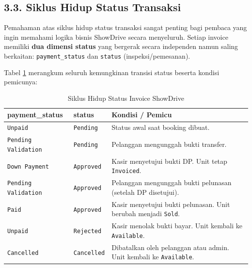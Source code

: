 \documentclass[11pt, a5paper]{article}
\begin{document}
\subsection*{3.3. Siklus Hidup Status Transaksi}

Pemahaman atas siklus hidup status transaksi sangat penting bagi pembaca yang
ingin memahami logika bisnis ShowDrive secara menyeluruh. Setiap invoice memiliki
\textbf{dua dimensi status} yang bergerak secara independen namun saling
berkaitan: \texttt{payment\_status} dan \texttt{status} (inspeksi/pemesanan).

Tabel \ref{tab:lifecycle} merangkum seluruh kemungkinan transisi status beserta
kondisi pemicunya:

\begin{table}[H]
  \centering
  \small
  \renewcommand{\arraystretch}{1.4}
  \caption{Siklus Hidup Status Invoice ShowDrive}
  \label{tab:lifecycle}
  \begin{tabularx}{\textwidth}{|l|l|X|}
    \hline
    \textbf{payment\_status} & \textbf{status} & \textbf{Kondisi / Pemicu} \\
    \hline
    \texttt{Unpaid}          & \texttt{Pending}   & Status awal saat booking dibuat. \\
    \hline
    \texttt{Pending Validation} & \texttt{Pending} & Pelanggan mengunggah bukti transfer. \\
    \hline
    \texttt{Down Payment}    & \texttt{Approved}  & Kasir menyetujui bukti DP. Unit tetap
                                                     \texttt{Invoiced}. \\
    \hline
    \texttt{Pending Validation} & \texttt{Approved} & Pelanggan mengunggah bukti pelunasan
                                                      (setelah DP disetujui). \\
    \hline
    \texttt{Paid}            & \texttt{Approved}  & Kasir menyetujui bukti pelunasan. Unit
                                                     berubah menjadi \texttt{Sold}. \\
    \hline
    \texttt{Unpaid}          & \texttt{Rejected}  & Kasir menolak bukti bayar. Unit kembali
                                                     ke \texttt{Available}. \\
    \hline
    \texttt{Cancelled}       & \texttt{Cancelled} & Dibatalkan oleh pelanggan atau admin.
                                                     Unit kembali ke \texttt{Available}. \\
    \hline
  \end{tabularx}
\end{table}
\end{document}
